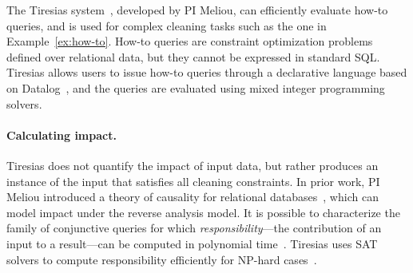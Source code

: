 

The Tiresias system~\cite{DBLP:conf/sigmod/MeliouS12,
  DBLP:conf/sigmod/MeliouSS12}, developed by PI Meliou, can
efficiently evaluate how-to queries, and is used for complex cleaning
tasks such as the one in Example~\ref{ex:how-to}. How-to queries are
constraint optimization problems defined over relational data, but
they cannot be expressed in standard SQL. Tiresias allows users to
issue how-to queries through a declarative language based on
Datalog~\cite{DBLP:journals/tkde/CeriGT89}, and the queries are
evaluated using mixed integer programming solvers.

\paragraph{Calculating impact.} %
\label{par:calculating_impact}

Tiresias does not quantify the impact of input data, but rather
produces an instance of the input that satisfies all cleaning
constraints. In prior work, PI Meliou introduced a theory of causality
for relational databases~\cite{DBLP:journals/debu/MeliouGHKMS10},
which can model impact under the reverse analysis model. It is
possible to characterize the family of conjunctive queries for which
\emph{responsibility}---the contribution of an input to a result---can
be computed in polynomial
time~\cite{DBLP:journals/pvldb/MeliouGMS11}. Tiresias uses SAT solvers
to compute responsibility efficiently for NP-hard
cases~\cite{DBLP:conf/sigmod/MeliouGNS11}.






